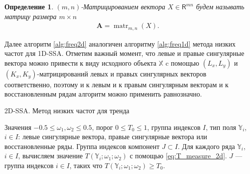 \documentclass[specialist,
               substylefile = spbu.rtx,
               subf,href,colorlinks=true, 12pt]{disser}
\def\matr{\mathop{\mathrm{matr}}}
\newtheorem{defn}{Определение}
\begin{document}
\begin{defn}
 $(m,n)$-Матрицированием вектора $X \in \mathsf{R}^{mn}$ будем называть матрицу размера $m \times n$
\begin{gather*}
 \mathbf{A} = \matr_{m,n} (X).
\end{gather*}
\end{defn}

Далее алгоритм \ref{alg:freq2d} аналогичен алгоритму \ref{alg:freq1d} метода низких частот для 1D-SSA.
Отметим важный момент, что левые и правые сингулярные вектора можно привести к виду исходного объекта $\mathbb{X}$ c помощью $(L_x, L_y)$ и $(K_x, K_y)$-матрицирований левых и правых сингулярных векторов соответственно, поэтому и к левым и к правым сингулярным векторам и к восстановленным рядам алгоритм можно применить равнозначно. 

 \begin{algorithm}[!hhh]
\caption{2D-SSA. Метод низких частот для тренда}
\label{alg:freq2d}
\begin{algorithmic}[1]
\REQUIRE Значения  $-0.5 \leqslant  \omega_1, \omega_2 \leqslant 0.5$, порог $0 \leqslant T_0 \leqslant 1$, группа индексов $I$, тип поля $\mathbb{Y}_i$, $i \in I$: левые сингулярные вектора,
правые сингулярные вектора или восстановленные ряды.
\ENSURE Группа индексов компонент $J \subset I$.
\STATE  Для каждого ряда $\mathbb{Y}_i$, $i \in I$, вычисляем значение $T(\mathbb{Y}_i; \omega_{1}; \omega_{2})$ с помощью \eqref{eq:T_measure_2d}.
\STATE $J$ --- группа индексов $i \in I$, таких что $T(\mathbb{Y}_i; \omega_{1}; \omega_{2}) \geqslant T_0$.
\end{algorithmic}
\end{algorithm}
\end{document}
